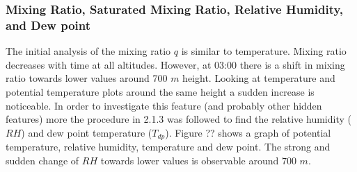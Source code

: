 \documentclass[a4paper,12pt]{article}
\numberwithin{equation}{section} %
\begin{document}
\subsubsection{Mixing Ratio, Saturated Mixing Ratio, Relative Humidity, and Dew point}

The initial analysis of the mixing ratio $q$ is similar to temperature. Mixing ratio decreases with time at all altitudes. However, at 03:00 there is a shift in mixing ratio towards lower values around 700 $m$ height. Looking at temperature and potential temperature plots around the same height a sudden increase is noticeable. In order to investigate this feature (and probably other hidden features) more the procedure in 2.1.3 was followed to find the relative humidity ($RH$) and dew point temperature ($T_{dp}$). Figure ?? shows a graph of potential temperature, relative humidity, temperature and dew point. The strong and sudden change of $RH$ towards lower values is observable around $700$ $m$. 





\end{document}
